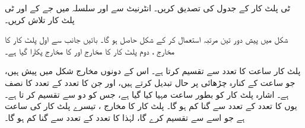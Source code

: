 ٹی پلٹ کار کے جدول کی تصدیق کریں۔
انٹرنیٹ سے  اور  سلسلہ میں جے کے اور ٹی پلٹ کار تلاش کریں۔


 
 
شکل  میں پیش دور تین مرتبہ استعمال کر کے شکل  حاصل ہو گا۔ بائیں جانب سے اول پلٹ کار  کا مخارج ، دوم پلٹ کار کا مخارج  اور  کا مخارج  پکارا گیا ہے۔

 پلٹ کار  ساعت  کا تعدد  سے تقسیم کرتا ہے۔ اس کے دونوں مخارج شکل میں پیش ہیں، جو ساعت کے کنارہ چڑھائی پر حال تبدیل کرتے ہیں، اور جن کا تعدد  کے تعدد کا نصف ہے۔ اشارہ  پلٹ کار  کو بطور ساعت مہیا کیا گیا ہے، جس کو  دو سے تقسیم کر تا ہے۔ یوں  کا تعدد  کے تعدد سے  گنا کم ہو گا۔ پلٹ کار  کا مخارج ، تیسرے پلٹ کار کی ساعت ہے جو اسے  سے تقسیم کرے گا، لہٰذا  کا تعدد  کے تعدد سے  گنا کم ہو گا۔


